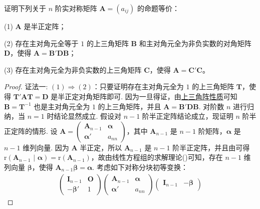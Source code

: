 \documentclass[../../main.tex]{subfiles}%
\begin{document}
\begin{proposition}\label{proposition:例8.78}
证明下列关于 $n$ 阶实对称矩阵 $\boldsymbol{A}=(a_{ij})$ 的命题等价：

(1) $\boldsymbol{A}$ 是半正定阵；

(2) 存在主对角元全等于 $1$ 的上三角矩阵 $\boldsymbol{B}$ 和主对角元全为非负实数的对角矩阵 $\boldsymbol{D}$，使得 $\boldsymbol{A}=\boldsymbol{B}'\boldsymbol{D}\boldsymbol{B}$；

(3) 存在主对角元全为非负实数的上三角矩阵 $\boldsymbol{C}$，使得 $\boldsymbol{A}=\boldsymbol{C}'\boldsymbol{C}$。
\end{proposition}
\begin{proof}

{\color{blue}证法一:}
$(1)\Rightarrow(2)$：只要证明存在主对角元全为 $1$ 的上三角矩阵 $\boldsymbol{T}$，使得 $\boldsymbol{T}'\boldsymbol{A}\boldsymbol{T}=\boldsymbol{D}$ 是半正定对角矩阵即可. 因为一旦得证，由\hyperref[proposition:上三角阵性质]{上三角阵性质}可知$\boldsymbol{B}=\boldsymbol{T}^{-1}$ 也是主对角元全为 $1$ 的上三角矩阵，并且 $\boldsymbol{A}=\boldsymbol{B}'\boldsymbol{D}\boldsymbol{B}$. 对阶数 $n$ 进行归纳，当 $n = 1$ 时结论显然成立. 假设对 $n - 1$ 阶半正定阵结论成立，现证明 $n$ 阶半正定阵的情形. 设 $\boldsymbol{A}=\begin{pmatrix}
\boldsymbol{A}_{n - 1} & \boldsymbol{\alpha} \\
\boldsymbol{\alpha}' & a_{nn}
\end{pmatrix}$，其中 $\boldsymbol{A}_{n - 1}$ 是 $n - 1$ 阶矩阵，$\boldsymbol{\alpha}$ 是 $n - 1$ 维列向量. 因为 $\boldsymbol{A}$ 半正定，所以 $\boldsymbol{A}_{n - 1}$ 是 $n - 1$ 阶半正定阵，并且由可得 $\mathrm{r}(\boldsymbol{A}_{n - 1}\,\,|\,\,\boldsymbol{\alpha})=\mathrm{r}(\boldsymbol{A}_{n - 1})$，故由线性方程组的求解理论()可知，存在 $n - 1$ 维列向量 $\boldsymbol{\beta}$，使得 $\boldsymbol{A}_{n - 1}\boldsymbol{\beta}=\boldsymbol{\alpha}$. 考虑如下对称分块初等变换：
\begin{align*}
\begin{pmatrix}
\boldsymbol{I}_{n - 1} & \boldsymbol{O} \\
-\boldsymbol{\beta}' & 1
\end{pmatrix}
\begin{pmatrix}
\boldsymbol{A}_{n - 1} & \boldsymbol{\alpha} \\
\boldsymbol{\alpha}' & a_{nn}
\end{pmatrix}
\begin{pmatrix}
\boldsymbol{I}_{n - 1} & -\boldsymbol{\beta} \\

\end{pmatrix}
\end{align*}
\end{proof}
\end{document}
